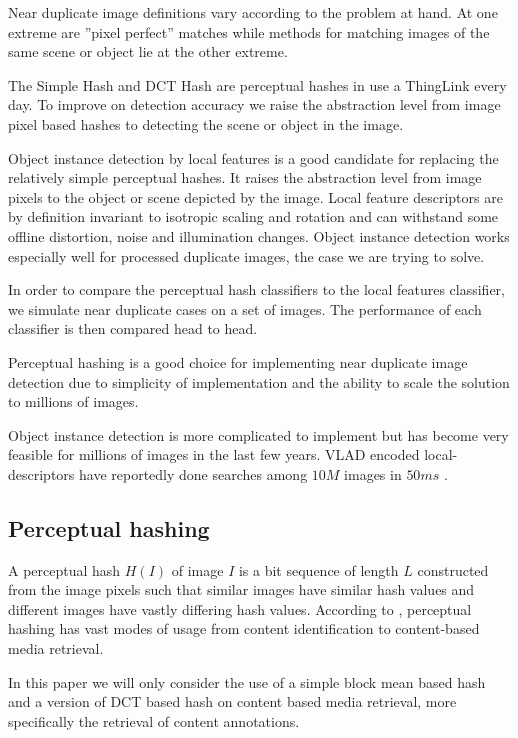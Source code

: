 \documentclass[english,12pt,a4paper,pdftex,elec,utf8]{aaltothesis}
\begin{document}
Near duplicate image definitions vary according to the problem at hand. At one extreme are ''pixel perfect'' matches while methods for matching images of the same scene or object lie at the other extreme.

The Simple Hash and DCT Hash are perceptual hashes in use a ThingLink every day. To improve on detection accuracy we raise the abstraction level from image pixel based hashes to detecting the scene or object in the image.

Object instance detection by local features is a good candidate for replacing the relatively simple perceptual hashes. It raises the abstraction level from image pixels to the object or scene depicted by the image. Local feature descriptors are by definition invariant to isotropic scaling and rotation and can withstand some offline distortion, noise and illumination changes. Object instance detection works especially well for processed duplicate images, the case we are trying to solve.

In order to compare the perceptual hash classifiers to the local features classifier, we simulate near duplicate cases on a set of images. The performance of each classifier is then compared head to head.

Perceptual hashing is a good choice for implementing near duplicate image detection due to simplicity of implementation and the ability to scale the solution to millions of images.

Object instance detection is more complicated to implement but has become very feasible for millions of images in the last few years. VLAD encoded local-descriptors have reportedly done searches among $10M$ images in $50ms$ \cite{Jegou2010}.

\subsection{Perceptual hashing} \label{perceptualhash}
A perceptual hash $H(I)$ of image $I$ is a bit sequence of length $L$ constructed from the image pixels such that similar images have similar hash values and different images have vastly differing hash values. According to \cite{Zauner2010}, perceptual hashing has vast modes of usage from content identification to content-based media retrieval.

In this paper we will only consider the use of a simple block mean based hash and a version of DCT based hash on content based media retrieval, more specifically the retrieval of content annotations.
\end{document}
